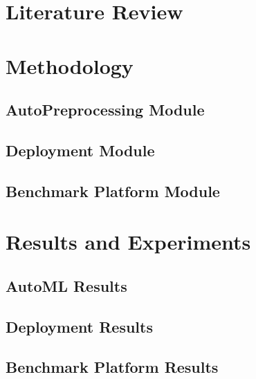 \documentclass[11pt,a4paper]{article}
\begin{document}
\section{Literature Review}


\section{Methodology}


\subsection{AutoPreprocessing Module}


\subsection{Deployment Module}

\vspace{2em}

\subsection{Benchmark Platform Module}

\vspace{2em}

\section{Results and Experiments}


\subsection{AutoML Results}

\vspace{2em}

\subsection{Deployment Results}

\vspace{2em}

\subsection{Benchmark Platform Results}
\end{document}
